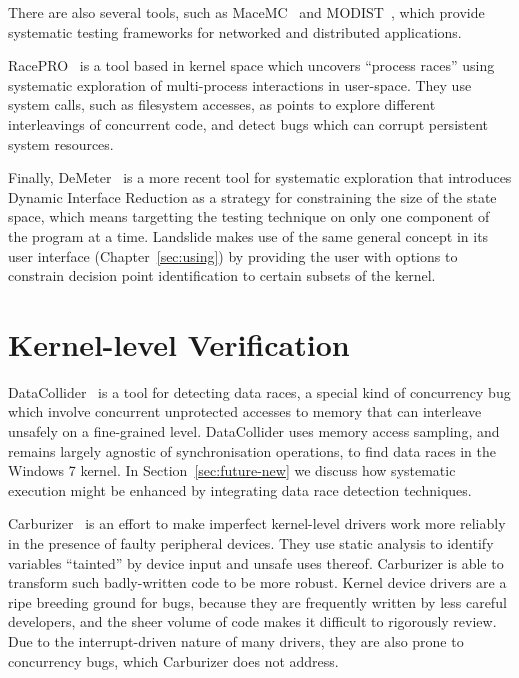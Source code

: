 There are also several tools, such as MaceMC~\cite{macemc} and MODIST~\cite{modist}, which provide systematic testing frameworks for networked and distributed applications.

RacePRO~\cite{racepro} is a tool based in kernel space which uncovers ``process races''  using systematic exploration of multi-process interactions in user-space. They use system calls, such as filesystem accesses, as points to explore different interleavings of concurrent code, and detect bugs which can corrupt persistent system resources.

Finally, DeMeter~\cite{demeter} is a more recent tool for systematic exploration that introduces Dynamic Interface Reduction as a strategy for constraining the size of the state space, which means targetting the testing technique on only one component of the program at a time. Landslide makes use of the same general concept in its user interface (Chapter~\ref{sec:using}) by providing the user with options to constrain decision point identification to certain subsets of the kernel.

\section{Kernel-level Verification}

DataCollider~\cite{datacollider} is a tool for detecting data races, a special kind of concurrency bug which involve concurrent unprotected accesses to memory that can interleave unsafely on a fine-grained level.
DataCollider uses memory access sampling, and remains largely agnostic of synchronisation operations, to find data races in the Windows 7 kernel.
In Section~\ref{sec:future-new} we discuss how systematic execution might be enhanced by integrating data race detection techniques.

Carburizer~\cite{carburizer} is an effort to make imperfect kernel-level drivers work more reliably in the presence of faulty peripheral devices. They use static analysis to identify variables ``tainted'' by device input and unsafe uses thereof. Carburizer is able to transform such badly-written code to be more robust.
Kernel device drivers are a ripe breeding ground for bugs, because they are frequently written by less careful developers, and the sheer volume of code makes it difficult to rigorously review.
Due to the interrupt-driven nature of many drivers, they are also prone to concurrency bugs, which Carburizer does not address.


